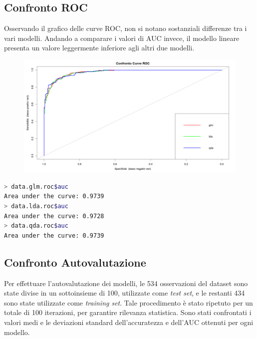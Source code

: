 \documentclass[11pt,a4paper]{article}
\begin{document}
\subsection{Confronto ROC}
Osservando il grafico delle curve ROC, non si notano sostanziali differenze tra i vari modelli. Andando a comparare i valori di AUC invece, il modello lineare presenta un valore leggermente inferiore agli altri due modelli.

\begin{figure}[h]
    \hspace{-1.7cm}
	\includegraphics[scale=0.55]{imgs/roc_curves_comparison.png}
    \end{figure}
\vspace{-0.4cm}

\begin{lstlisting}[language=bash,basicstyle=\tiny,tabsize=2,frame = single]
> data.glm.roc$auc
Area under the curve: 0.9739
> data.lda.roc$auc
Area under the curve: 0.9728
> data.qda.roc$auc
Area under the curve: 0.9739
\end{lstlisting}

\subsection{Confronto Autovalutazione}
Per effettuare l'autovalutazione dei modelli, le 534 osservazioni del dataset sono state divise in un sottoinsieme di 100, utilizzate come \emph{test set}, e le restanti 434 sono state utilizzate come \emph{training set}. Tale procedimento è stato ripetuto per un totale di 100 iterazioni, per garantire rilevanza statistica.
Sono stati confrontati i valori medi e le deviazioni standard dell'accuratezza e dell'AUC ottenuti per ogni modello.
\end{document}
